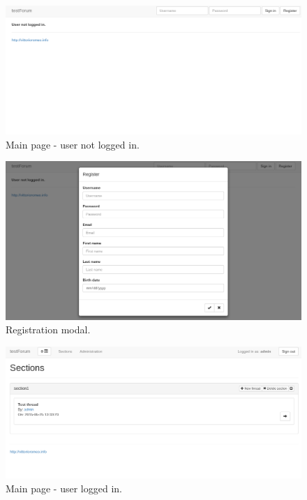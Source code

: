 \documentclass[12pt]{report}
\begin{document}
            \begin{figure}[!htb]
            \caption{Main page - user not logged in.}
            \centering
            \includegraphics[width=1\textwidth]{u/0}
            \end{figure}

            \begin{figure}[!htb]
            \caption{Registration modal.}
            \centering
            \includegraphics[width=1\textwidth]{u/1}
            \end{figure}

            \begin{figure}[!htb]
            \caption{Main page - user logged in.}
            \centering
            \includegraphics[width=1\textwidth]{u/2}
            \end{figure}
\end{document}
